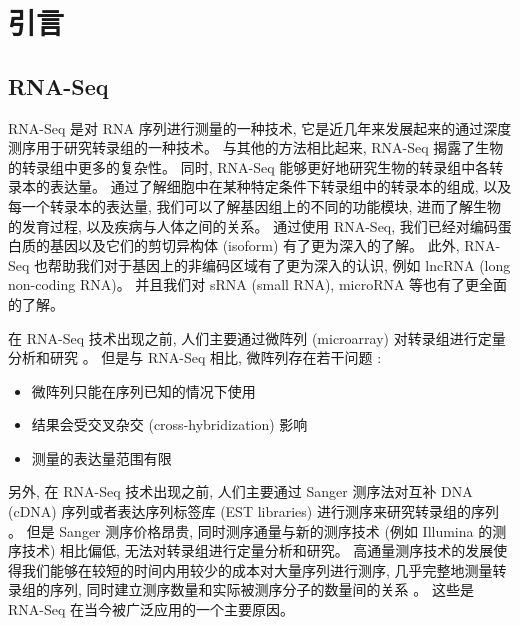 \chapter{引言}

\section{RNA-Seq}
\nocite{wang2009rna, ozsolak2010rna, garber2011computational}

RNA-Seq 是对 RNA 序列进行测量的一种技术, 
它是近几年来发展起来的通过深度测序用于研究转录组的一种技术。
与其他的方法相比起来, RNA-Seq 揭露了生物的转录组中更多的复杂性。 
同时, RNA-Seq 能够更好地研究生物的转录组中各转录本的表达量。 
通过了解细胞中在某种特定条件下转录组中的转录本的组成, 
以及每一个转录本的表达量, 我们可以了解基因组上的不同的功能模块, 
进而了解生物的发育过程, 以及疾病与人体之间的关系。 
通过使用 RNA-Seq, 我们已经对编码蛋白质的基因以及它们的剪切异构体 (isoform) 有了更为深入的了解。 
此外, RNA-Seq 也帮助我们对于基因上的非编码区域有了更为深入的认识, 
例如 lncRNA (long non-coding RNA)。
并且我们对 sRNA (small RNA), microRNA 等也有了更全面的了解。 
\cite{pickrell2010understanding, encode, nagalakshmi2008transcriptional, 
tang2009mrna, banfai2012long, mortazavi2008mapping, wang2008alternative, 
katz2010analysis, deng2011isoform, lu2010function, mercer2011targeted, 
howald2012combining, lalonde2011rna, djebali2012landscape, 
derrien2012gencode, gerstein2012architecture, fairfax2012genetics, 
morrissy2011extensive, howald2012combining, park2012rna, 
tilgner2012deep, orom2010long, mercer2011human, chung2011computational, 
gingeras2009implications, roy2010identification, axtell2011vive, 
berezikov2010evolutionary, cherbas2011transcriptional, anders2012detecting, 
stoeckius2009large, lau2009abundant}

在 RNA-Seq 技术出现之前, 人们主要通过微阵列 (microarray) 对转录组进行定量分析和研究 \cite{schena1995quantitative}。 
但是与 RNA-Seq 相比, 微阵列存在若干问题 \cite{wang2009rna}: 
\begin{itemize}
\item 微阵列只能在序列已知的情况下使用

\item 结果会受交叉杂交 (cross-hybridization) 影响 \cite{okoniewski2006hybridization, royce2007toward}

\item 测量的表达量范围有限
\end{itemize}
另外, 在 RNA-Seq 技术出现之前, 人们主要通过 Sanger 测序法对互补 DNA (cDNA) 序列或者表达序列标签库 (EST libraries) 进行测序来研究转录组的序列 \cite{boguski1994gene, gerhard2004status}。 
但是 Sanger 测序价格昂贵, 同时测序通量与新的测序技术 (例如 Illumina 的测序技术) 相比偏低, 
无法对转录组进行定量分析和研究。 
高通量测序技术的发展使得我们能够在较短的时间内用较少的成本对大量序列进行测序, 
几乎完整地测量转录组的序列, 
同时建立测序数量和实际被测序分子的数量间的关系 \cite{marioni2008rna}。 
这些是 RNA-Seq 在当今被广泛应用的一个主要原因。 

